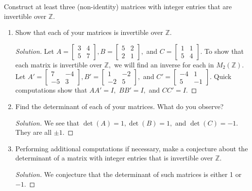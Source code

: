 \documentclass[12pt]{article}
\newcommand{\Z}{\mathbb{Z}}
\newenvironment{exercise}[2][Exercise]{\begin{trivlist}
        \item[\hskip \labelsep {\bfseries #1}\hskip \labelsep {\bfseries #2.}]}{\end{trivlist}}
\newenvironment{solution}
        {\begin{proof}[Solution]}
                    {\end{proof}}
\begin{document}
\begin{exercise}{32}
    Construct at least three (non-identity) matrices with integer entries that are invertible over \( \Z. \)
    \begin{enumerate}[label=(\alph*)]
        \item Show that each of your matrices is invertible over \( \Z. \)
            \begin{solution}
                Let \( A = \begin{bmatrix}
                    3 & 4\\
                    5 & 7
                \end{bmatrix} , B = \begin{bmatrix}
                    5 & 2\\
                    2 & 1
                \end{bmatrix} ,\) and \( C = \begin{bmatrix}
                    1 & 1\\
                    5 & 4
                \end{bmatrix} .\)
                To show that each matrix is invertible over \( \Z, \) we will find an inverse for each in \( M_{2}(\Z) . \) Let \( A' = \begin{bmatrix}
                    7 & -4\\
                    -5 & 3
                \end{bmatrix}, B' = \begin{bmatrix}
                    1 & -2\\
                    -2 & 5
                \end{bmatrix} , \) and \( C' = \begin{bmatrix}
                    -4 & 1\\
                    5 & -1
                \end{bmatrix} .\) Quick computations show that \( AA' = I, \) \( BB' = I, \) and \( CC' = I. \)
            \end{solution}
        \item Find the determinant of each of your matrices. What do you observe?
            \begin{solution}
                We see that \( \det(A) = 1, \det(B) = 1, \) and \( \det(C) = -1. \) They are all \( \pm 1. \)
            \end{solution}
        \item Performing additional computations if necessary, make a conjecture about the determinant of a matrix with integer entries that is invertible over \( \Z \).
            \begin{solution}
                We conjecture that the determinant of such matrices is either 1 or \( -1. \)
            \end{solution}
    \end{enumerate}
\end{exercise}
\end{document}
